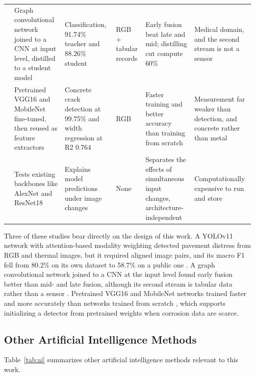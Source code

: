 {\begin{xltabular}{\textwidth}{p{0.95cm}>{\RaggedRight\arraybackslash}p{2.6cm}>{\RaggedRight\arraybackslash}p{2.6cm}>{\RaggedRight\arraybackslash}p{2.1cm}>{\RaggedRight\arraybackslash}X>{\RaggedRight\arraybackslash}X}
\citep{Chowdhury2026} & Graph convolutional network joined to a CNN at input level, distilled to a student model & Classification, 91.74\% teacher and 88.26\% student & RGB + tabular records & Early fusion beat late and mid; distilling cut compute 60\% & Medical domain, and the second stream is not a sensor \\
\citep{Su2024} & Pretrained VGG16 and MobileNet fine-tuned, then reused as feature extractors & Concrete crack detection at 99.75\% and width regression at R2 0.764 & RGB & Faster training and better accuracy than training from scratch & Measurement far weaker than detection, and concrete rather than metal \\
\citep{Kharyuk2026} & Tests existing backbones like AlexNet and ResNet18 & Explains model predictions under image changes & None & Separates the effects of simultaneous input changes, architecture-independent & Computationally expensive to run and store \\
\end{xltabular}
}


Three of these studies bear directly on the design of this work. A YOLOv11
network with attention-based modality weighting detected pavement distress from
RGB and thermal images, but it required aligned image pairs, and its macro F1
fell from 80.2\% on its own dataset to 58.7\% on a public one \citep{Zhang2026b}. A graph
convolutional network joined to a CNN at the input level found early fusion
better than mid- and late fusion, although its second stream is tabular data
rather than a sensor \citep{Chowdhury2026}. Pretrained VGG16 and MobileNet networks trained
faster and more accurately than networks trained from scratch \citep{Su2024}, which
supports initializing a detector from pretrained weights when corrosion data are
scarce.

\subsection{Other Artificial Intelligence Methods}

Table~\ref{tab:ai} summarizes other artificial intelligence methods relevant to
this work.


